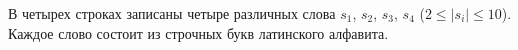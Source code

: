 В четырех строках записаны четыре различных слова $s_1$, $s_2$, $s_3$, $s_4$ ($2 \le \lvert s_i \rvert \le 10$). Каждое слово состоит из строчных букв латинского алфавита.